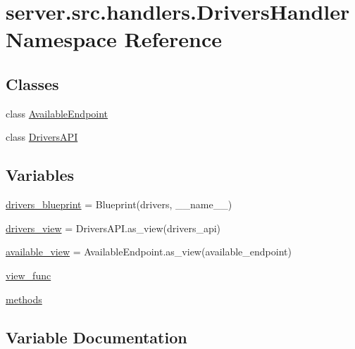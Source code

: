 \hypertarget{namespaceserver_1_1src_1_1handlers_1_1_drivers_handler}{}\section{server.\+src.\+handlers.\+Drivers\+Handler Namespace Reference}
\label{namespaceserver_1_1src_1_1handlers_1_1_drivers_handler}
\subsection*{Classes}
\begin{DoxyCompactItemize}
\item 
class \hyperlink{classserver_1_1src_1_1handlers_1_1_drivers_handler_1_1_available_endpoint}{Available\+Endpoint}
\item 
class \hyperlink{classserver_1_1src_1_1handlers_1_1_drivers_handler_1_1_drivers_a_p_i}{Drivers\+A\+PI}
\end{DoxyCompactItemize}
\subsection*{Variables}
\begin{DoxyCompactItemize}
\item 
\hyperlink{namespaceserver_1_1src_1_1handlers_1_1_drivers_handler_ac15b68f00fb1e08ff9dd46f13f34e82f}{drivers\+\_\+blueprint} = Blueprint(\textquotesingle{}drivers\textquotesingle{}, \+\_\+\+\_\+name\+\_\+\+\_\+)
\item 
\hyperlink{namespaceserver_1_1src_1_1handlers_1_1_drivers_handler_ac76d8dfea6082ab7b13dd0d276233de9}{drivers\+\_\+view} = Drivers\+A\+P\+I.\+as\+\_\+view(\textquotesingle{}drivers\+\_\+api\textquotesingle{})
\item 
\hyperlink{namespaceserver_1_1src_1_1handlers_1_1_drivers_handler_a7c1c480eaf0befef25de1afc735af217}{available\+\_\+view} = Available\+Endpoint.\+as\+\_\+view(\textquotesingle{}available\+\_\+endpoint\textquotesingle{})
\item 
\hyperlink{namespaceserver_1_1src_1_1handlers_1_1_drivers_handler_af37c168b94ff719ffb324453c5c1cd06}{view\+\_\+func}
\item 
\hyperlink{namespaceserver_1_1src_1_1handlers_1_1_drivers_handler_a3634d5c3f882ab668da5e543eaec9be9}{methods}
\end{DoxyCompactItemize}


\subsection{Variable Documentation}
